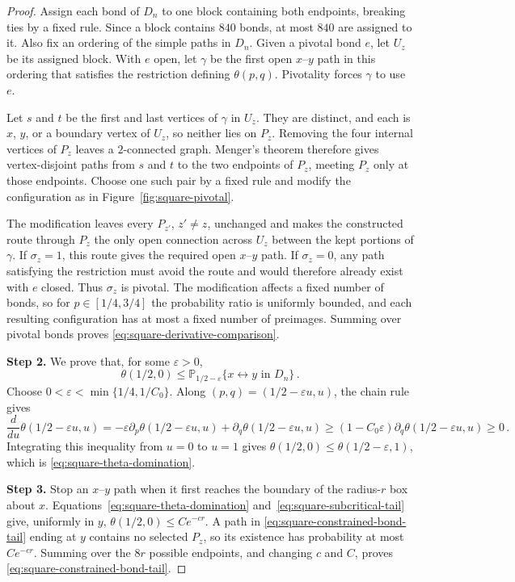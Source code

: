 \documentclass[11pt]{amsart}
\theoremstyle{plain}
\theoremstyle{definition}
\renewcommand{\P}{\mathbb P}
\begin{document}
\begin{proof}
		Assign each bond of $D_n$ to one block containing both endpoints, breaking ties
		by a fixed rule.  Since a block contains $840$ bonds, at most $840$ are assigned
		to it.  Also fix an ordering of the simple paths in $D_n$.  Given a pivotal bond
		$e$, let $U_z$ be its assigned block.  With $e$ open, let $\gamma$ be the first
		open $x$--$y$ path in this ordering that satisfies the restriction defining
		$\theta(p,q)$.  Pivotality forces $\gamma$ to use $e$.

		Let $s$ and $t$ be the first and last vertices of $\gamma$ in $U_z$.  They are
		distinct, and each is $x$, $y$, or a boundary vertex of $U_z$, so neither lies
		on $P_z$.  Removing the four internal vertices of $P_z$ leaves a $2$-connected
		graph.  Menger's theorem therefore gives vertex-disjoint paths from $s$ and $t$
		to the two endpoints of $P_z$, meeting $P_z$ only at those endpoints.  Choose
		one such pair by a fixed rule and modify the configuration as in
		Figure~\ref{fig:square-pivotal}.

		The modification leaves every $P_{z'}$, $z'\ne z$, unchanged and makes the
		constructed route through $P_z$ the only open connection across $U_z$ between
		the kept portions of $\gamma$.  If $\sigma_z=1$, this route gives the required
		open $x$--$y$ path.  If $\sigma_z=0$, any path satisfying the restriction must
		avoid the route and would therefore already exist with $e$ closed.  Thus
		$\sigma_z$ is pivotal.  The modification affects a fixed number of bonds, so
		for $p\in[1/4,3/4]$ the probability ratio is uniformly bounded, and each
		resulting configuration has at most a fixed number of preimages.  Summing over
		pivotal bonds proves \eqref{eq:square-derivative-comparison}.
		
		\noindent\textbf{Step 2.}  We prove that, for some $\varepsilon>0$,
		\begin{equation}\label{eq:square-theta-domination}
			\theta(1/2,0)\leq\P_{1/2-\varepsilon}\{x\longleftrightarrow y\text{ in }D_n\}\, .
		\end{equation}
		Choose $0<\varepsilon<\min\{1/4,1/C_0\}$.  Along
		$(p,q)=(1/2-\varepsilon u,u)$, the chain rule gives
		\[
		\frac d{du}\theta(1/2-\varepsilon u,u)
		=-\varepsilon\partial_p\theta(1/2-\varepsilon u,u)
		 +\partial_q\theta(1/2-\varepsilon u,u)
		\geq(1-C_0\varepsilon)\partial_q\theta(1/2-\varepsilon u,u)
		\geq0\, .
		\]
		Integrating this inequality from $u=0$ to $u=1$ gives
		$\theta(1/2,0)\leq\theta(1/2-\varepsilon,1)$, which is
		\eqref{eq:square-theta-domination}.
		
		\noindent\textbf{Step 3.}  Stop an $x$--$y$ path when it first reaches the boundary of the
		radius-$r$ box about $x$.  Equations~\eqref{eq:square-theta-domination}
		and~\eqref{eq:square-subcritical-tail} give, uniformly in $y$,
		$\theta(1/2,0)\leq Ce^{-cr}$.  A path in
		\eqref{eq:square-constrained-bond-tail} ending at $y$ contains no selected
		$P_z$, so its existence has probability at most $Ce^{-cr}$.  Summing over the
		$8r$ possible endpoints, and changing $c$ and $C$, proves
		\eqref{eq:square-constrained-bond-tail}.
	\end{proof}
	
\end{document}
